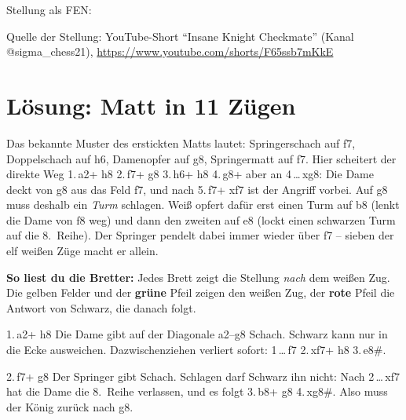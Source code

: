 \vfill
{\footnotesize Stellung als FEN: \texttt{\StartFEN}\par
Quelle der Stellung: YouTube-Short \enquote{Insane Knight Checkmate} (Kanal @sigma\_chess21),
\url{https://www.youtube.com/shorts/F65ssb7mKkE}}

\newpage
\section*{Lösung: Matt in 11 Zügen}

\newchessgame[id=druck, setfen=\StartFEN]

\begin{hinweis}
	Das bekannte Muster des erstickten Matts lautet: Springerschach auf f7, Doppelschach auf h6,
	Damenopfer auf g8, Springermatt auf f7. Hier scheitert der direkte Weg
	1.\,\D a2+ \K h8 2.\,\Sp f7+ \K g8 3.\,\Sp h6+ \K h8 4.\,\D g8+ aber an 4\,\ldots\,\D xg8:
	Die Dame deckt von g8 aus das Feld f7, und nach 5.\,\Sp f7+ \D xf7 ist der Angriff vorbei.
	Auf g8 muss deshalb ein \textit{Turm} schlagen. Weiß opfert dafür erst einen Turm auf b8
	(lenkt die Dame von f8 weg) und dann den zweiten auf e8 (lockt einen schwarzen Turm auf die 8.~Reihe).
	Der Springer pendelt dabei immer wieder über f7 – sieben der elf weißen Züge macht er allein.
\end{hinweis}

\textbf{So liest du die Bretter:} Jedes Brett zeigt die Stellung \textit{nach} dem weißen Zug.
Die gelben Felder und der \textcolor{akzentgruen}{\textbf{grüne}} Pfeil zeigen den weißen Zug, der
\textcolor{akzentrot}{\textbf{rote}} Pfeil die Antwort von Schwarz, die danach folgt.

\bigskip

{1.\,\D a2+ \quad \K h8}
{Die Dame gibt auf der Diagonale a2--g8 Schach. Schwarz kann nur in die Ecke ausweichen.
	Dazwischenziehen verliert sofort: 1\,\ldots\,\D f7 2.\,\D xf7+ \K h8 3.\,\D e8\#.}

{2.\,\Sp f7+ \quad \K g8}
{Der Springer gibt Schach. Schlagen darf Schwarz ihn nicht: Nach 2\,\ldots\,\D xf7 hat die Dame
	die 8.~Reihe verlassen, und es folgt 3.\,\T b8+ \D g8 4.\,\T xg8\#. Also muss der König zurück nach g8.}


